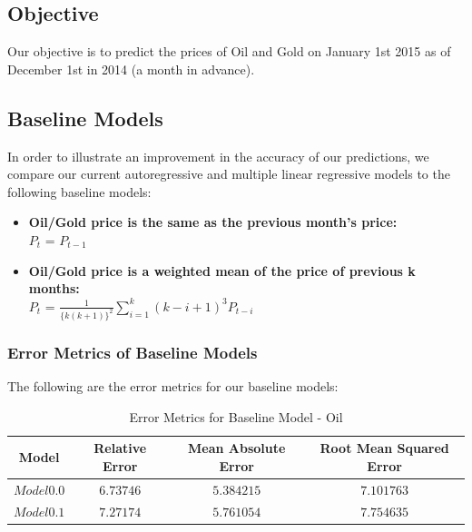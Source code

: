 \documentclass[runningheads]{llncs}
\begin{document}
\subsection{Objective}
Our objective is to predict the prices of Oil and Gold on January 1st 2015 as of December 1st in 2014 (a month in advance).

\subsection{Baseline Models}
In order to illustrate an improvement in the accuracy of our predictions, we compare our current autoregressive and multiple linear regressive models to the following baseline models:

\begin {itemize}
\item \textbf{Oil/Gold price is the same as the previous month's price:} \\
$P_{t}$ = $P_{t-1}$\\
\item \textbf{Oil/Gold price is a weighted mean of the price of previous k months:} \\
$P_{t}$ = $\frac{1}{\{k(k+1)\}^2}\sum\limits_{i=1}^k (k-i+1)^3P_{t-i}$
\end {itemize}

\subsubsection {Error Metrics of Baseline Models} The following are the error metrics for our baseline models: \\

\begin{table}
\begin{center}
\begin{tabular}{|c|c|c|c|}
\hline
Model & Relative Error & Mean Absolute Error & Root Mean Squared Error \\ \hline
$ Model 0.0 $ & $6.73746$ & $5.384215$ & $7.101763$ \\ \hline
$ Model 0.1 $ & $7.27174$ & $5.761054$ & $7.754635$\\ \hline
\end{tabular}
\end{center}
\caption{Error Metrics for Baseline Model - Oil}
\end{table}
\end{document}
